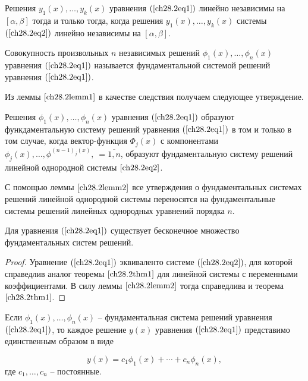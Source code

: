 \begin{cons}
Решения $y_1(x), \ldots, y_k(x)$ уравнения $(\ref{ch28.2eq1})$ линейно независимы на $[\alpha, \beta]$ тогда и только тогда, когда решения $y_1(x), \ldots, y_k(x)$ системы $(\ref{ch28.2eq2})$ линейно независимы на $[\alpha, \beta]$.
\end{cons}

\begin{defn}
Совокупность произвольных $n$ независимых решений $\phi_1(x), \ldots, \phi_n(x)$ уравнения $(\ref{ch28.2eq1})$ называется фундаментальной системой решений уравнения $(\ref{ch28.2eq1})$.
\end{defn}

Из леммы $\ref{ch28.2lemm1}$ в качестве следствия получаем следующее утверждение.

\begin{lemm} \label{ch28.2lemm2}
Решения $\phi_1(x), \ldots, \phi_n(x)$ уравнения $(\ref{ch28.2eq1})$ образуют функдаментальную систему решений уравнения $(\ref{ch28.2eq1})$ в том и только в том случае, когда вектор-функция $\Phi_j(x)$ с компонентами $\phi_j(x), \ldots, \phi^{(n - 1)_j(x)}, \:  = \overline{1,n}$, образуют фундаментальную систему решений линейной однородной системы $\ref{ch28.2eq2}$.
\end{lemm}

С помощью леммы $\ref{ch28.2lemm2}$ все утверждения о фундаментальных системах решений линейной однородной системы переносятся на фундаментальные системы решений линейных однородных уравнений порядка $n$.

\begin{thm} \label{ch28.2thm1}
Для уравнения $(\ref{ch28.2eq1})$ существует бесконечное множество фундаментальных систем решений.
\end{thm}

\begin{proof}
Уравнение $(\ref{ch28.2eq1})$ эквиваленто системе $(\ref{ch28.2eq2})$, для которой справедлив аналог теоремы $\ref{ch28.2thm1}$ для линейной системы с переменными коэффициентами. В силу леммы $\ref{ch28.2lemm2}$ тогда справедлива и теорема $\ref{ch28.2thm1}$.
\end{proof}

\begin{thm} \label{ch28.2thm2}
Если $\phi_1(x), \ldots, \phi_n(x)$ -- фундаментальная система решений уравнения $(\ref{ch28.2eq1})$, то каждое решение $y(x)$ уравнения $(\ref{ch28.2eq1})$ представимо единственным образом в виде

$$
y(x) = c_1\phi_1(x) + \cdots + c_n\phi_n(x),
$$
где $c_1, \ldots, c_n$ -- постоянные.
\end{thm}

